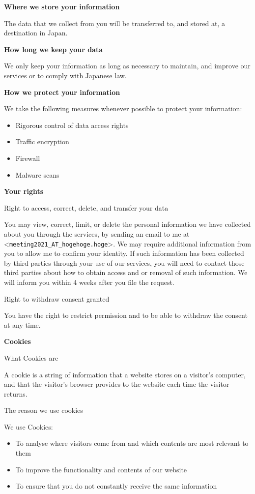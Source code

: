 \documentclass[titlepage,10pt,a4paper,uplatex]{jsbook}
\newenvironment{content}{\begin{shaded}\vspace{-1em}\raggedright\ttfamily\footnotesize\setlength{\baselineskip}{1.4em}}{\end{shaded}\vspace{-1em}}
\renewcommand{\textbf}[1]{{\bfseries\sffamily#1}}
\begin{document}
\begin{content}
\textbf{\Large Where we store your information}

The data that we collect from you will be transferred to, and stored at, a destination in Japan.

\textbf{\Large How long we keep your data}

We only keep your information as long as necessary to maintain, and improve our services or to comply with Japanese law.

\textbf{\Large How we protect your information}

We take the following measures whenever possible to protect your information:

\begin{itemize}
\item Rigorous control of data access rights
\item Traffic encryption
\item Firewall
\item Malware scans
\end{itemize}

\textbf{\Large Your rights}

{\Large Right to access, correct, delete, and transfer your data}

You may view, correct, limit, or delete the personal information we have collected about you through the services, by sending an email to me at {\textless}\texttt{meeting2021\_AT\_hogehoge.hoge}{\textgreater}. We may require additional information from you to allow me to confirm your identity. If such information has been collected by third parties through your use of our services, you will need to contact those third parties about how to obtain access and or removal of such information. We will inform you within 4 weeks after you file the request.

{\Large Right to withdraw consent granted}

You have the right to restrict permission and to be able to withdraw the consent at any time.

\textbf{\Large Cookies}

{\Large What Cookies are}

A cookie is a string of information that a website stores on a visitor's computer, and that the visitor's browser provides to the website each time the visitor returns.

{\Large The reason we use cookies}

We use Cookies:

\begin{itemize}
\item To analyse where visitors come from and which contents are most relevant to them
\item To improve the functionality and contents of our website
\item To ensure that you do not constantly receive the same information
\end{itemize}


\end{content}
\end{document}

